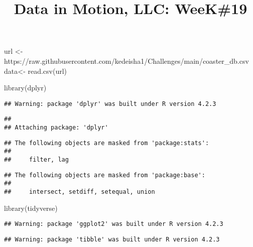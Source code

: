 \documentclass[
]{article}
\title{Data in Motion, LLC: WeeK\#19}
\author{}
\date{\vspace{-2.5em}}
\newenvironment{Shaded}{\begin{snugshade}}{\end{snugshade}}
\newcommand{\FunctionTok}[1]{\textcolor[rgb]{0.00,0.00,0.00}{#1}}
\newcommand{\NormalTok}[1]{#1}
\newcommand{\OtherTok}[1]{\textcolor[rgb]{0.56,0.35,0.01}{#1}}
\newcommand{\StringTok}[1]{\textcolor[rgb]{0.31,0.60,0.02}{#1}}
\begin{document}
\maketitle

\begin{Shaded}
\begin{Highlighting}[]
\NormalTok{url }\OtherTok{\textless{}{-}} \StringTok{\textquotesingle{}https://raw.githubusercontent.com/kedeisha1/Challenges/main/coaster\_db.csv\textquotesingle{}}
\NormalTok{data}\OtherTok{\textless{}{-}} \FunctionTok{read.csv}\NormalTok{(url)}
\end{Highlighting}
\end{Shaded}

\begin{Shaded}
\begin{Highlighting}[]
\FunctionTok{library}\NormalTok{(dplyr)}
\end{Highlighting}
\end{Shaded}

\begin{verbatim}
## Warning: package 'dplyr' was built under R version 4.2.3
\end{verbatim}

\begin{verbatim}
## 
## Attaching package: 'dplyr'
\end{verbatim}

\begin{verbatim}
## The following objects are masked from 'package:stats':
## 
##     filter, lag
\end{verbatim}

\begin{verbatim}
## The following objects are masked from 'package:base':
## 
##     intersect, setdiff, setequal, union
\end{verbatim}

\begin{Shaded}
\begin{Highlighting}[]
\FunctionTok{library}\NormalTok{(tidyverse)}
\end{Highlighting}
\end{Shaded}

\begin{verbatim}
## Warning: package 'ggplot2' was built under R version 4.2.3
\end{verbatim}

\begin{verbatim}
## Warning: package 'tibble' was built under R version 4.2.3
\end{verbatim}
\end{document}

